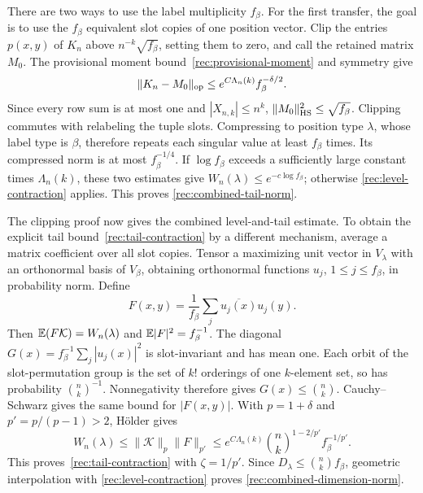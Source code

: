 There are two ways to use the label multiplicity $f_\beta$.
For the first transfer, the goal is to use the $f_\beta$ equivalent
slot copies of one position vector.  Clip the entries $p(x,y)$ of $K_n$ above
$n^{-k}\sqrt{f_\beta}$, setting them to zero, and call the retained
matrix $M_0$.  The provisional moment bound~\eqref{rec:provisional-moment} and
symmetry give
\begin{equation}\label{rec:tail-clipping-error}
 \|K_n-M_0\|_{\mathrm{op}}\le e^{C\Lambda_n(k)}f_\beta^{-\delta/2}.
\end{equation}
Since every row sum is at most one and $|X_{n,k}|\le n^k$,
$\|M_0\|_{\mathrm{HS}}^2\le\sqrt{f_\beta}$.
Clipping commutes with relabeling the tuple slots.  Compressing to
position type $\lambda$, whose label type is $\beta$, therefore repeats
each singular value at least $f_\beta$ times.  Its compressed norm is
at most $f_\beta^{-1/4}$.  If $\log f_\beta$ exceeds a sufficiently
large constant times $\Lambda_n(k)$, these two estimates give
$W_n(\lambda)\le e^{-c\log f_\beta}$; otherwise
\eqref{rec:level-contraction} applies.  This proves
\eqref{rec:combined-tail-norm}.

The clipping proof now gives the combined level-and-tail estimate.  To
obtain the explicit tail bound~\eqref{rec:tail-contraction} by a different
mechanism, average a matrix coefficient over all slot copies.  Tensor a maximizing unit vector in $V_\lambda$ with an
orthonormal basis of $V_\beta$, obtaining orthonormal functions $u_j$,
$1\le j\le f_\beta$, in probability norm.  Define
\[
 F(x,y)=\frac{1}{f_\beta}\sum_j\overline{u_j(x)}u_j(y).
\]
Then $\mathbb E(F\mathcal K)=W_n(\lambda)$ and
$\mathbb E|F|^2=f_\beta^{-1}$.  The diagonal
$G(x)=f_\beta^{-1}\sum_j|u_j(x)|^2$ is slot-invariant and has mean
one.  Each orbit of the slot-permutation group is the set of $k!$
orderings of one $k$-element set, so has probability
$\binom nk^{-1}$.  Nonnegativity therefore gives
$G(x)\le\binom nk$.  Cauchy--Schwarz gives the same bound
for $|F(x,y)|$.  With $p=1+\delta$ and $p'=p/(p-1)>2$, H\"older gives
\begin{equation}\label{rec:tail-averaged-coefficient}
 W_n(\lambda)\le\|\mathcal K\|_p\|F\|_{p'}
 \le e^{C\Lambda_n(k)}{n\choose k}^{1-2/p'}f_\beta^{-1/p'}.
\end{equation}
This proves~\eqref{rec:tail-contraction} with $\zeta=1/p'$.
Since $D_\lambda\le{n\choose k}f_\beta$, geometric interpolation with
\eqref{rec:level-contraction} proves
\eqref{rec:combined-dimension-norm}.


